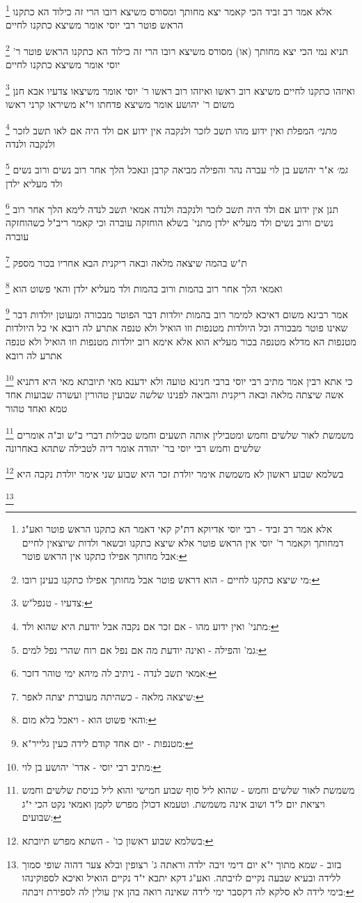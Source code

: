 \documentclass[12pt, openany]{book}
\newcommand{\footnotecomment}[1]{
	\renewcommand\thefootnote{}
	\footnote{#1}}
\newcommand{\commenta}[1]{\footnotecomment{#1}}
\begin{document}
{{\commenta{אלא אמר רב זביד - רבי יוסי אדיוקא דת"ק קאי דאמר הא כתקנו הראש פוטר ואע"ג דמחותך וקאמר ר' יוסי אין הראש פוטר אלא שיצא כתקנו וכשאר ולדות שיוצאין לחיים אבל מחותך אפילו כתקנו אין הראש פוטר:}
אלא אמר רב זביד הכי קאמר יצא מחותך ומסורס משיצא רובו הרי זה כילוד הא כתקנו הראש פוטר רבי יוסי אומר משיצא כתקנו לחיים 
\commenta{מי שיצא כתקנו לחיים - הוא דראש פוטר אבל מחותך אפילו כתקנו בעינן רובו:}
תניא נמי הכי יצא מחותך (או) מסורס משיצא רובו הרי זה כילוד הא כתקנו הראש פוטר ר' יוסי אומר משיצא כתקנו לחיים 
\commenta{צדעיו - טנפל"ש:}
ואיזהו כתקנו לחיים משיצא רוב ראשו ואיזהו רוב ראשו ר' יוסי אומר משיצאו צדעיו אבא חנן משום ר' יהושע אומר משיצא פדחתו וי"א משיראו קרני ראשו
\commenta{מתני' ואין ידוע מהו - אם זכר אם נקבה אבל יודעת היא שהוא ולד:}
{\large\emph{מתני׳}} המפלת ואין ידוע מהו תשב לזכר ולנקבה אין ידוע אם ולד היה אם לאו תשב לזכר ולנקבה ולנדה
\commenta{גמ' והפילה - ואינה יודעת מה אם נפל אם רוח שהרי נפל למים:}
{\large\emph{גמ׳}} א"ר יהושע בן לוי עברה נהר והפילה מביאה קרבן ונאכל הלך אחר רוב נשים ורוב נשים ולד מעליא ילדן 
\commenta{אמאי תשב לנדה - ניתיב לה מיהא ימי טוהר דזכר:}
תנן אין ידוע אם ולד היה תשב לזכר ולנקבה ולנדה אמאי תשב לנדה לימא הלך אחר רוב נשים ורוב נשים ולד מעליא ילדן 
מתני' בשלא הוחזקה עוברה וכי קאמר ריב"ל כשהוחזקה עוברה 
\commenta{שיצאה מלאה - כשהיתה מעוברת יצתה לאפר:}
ת"ש בהמה שיצאה מלאה ובאה ריקנית הבא אחריו בכור מספק 
\commenta{והאי פשוט הוא - ויאכל בלא מום:}
ואמאי הלך אחר רוב בהמות ורוב בהמות ולד מעליא ילדן והאי פשוט הוא 
\commenta{מטנפות - יום אחד קודם לידה כעין גלייר"א:}
אמר רבינא משום דאיכא למימר רוב בהמות יולדות דבר הפוטר מבכורה ומעוטן יולדות דבר שאינו פוטר מבכורה וכל היולדות מטנפות וזו הואיל ולא טנפה אתרע לה רובא 
אי כל היולדות מטנפות הא מדלא מטנפה בכור מעליא הוא אלא אימא רוב יולדות מטנפות וזו הואיל ולא טנפה אתרע לה רובא 
\commenta{מתיב רבי יוסי - אדר' יהושע בן לוי:}
כי אתא רבין אמר מתיב רבי יוסי ברבי חנינא טועה ולא ידענא מאי תיובתא מאי היא דתניא
אשה שיצתה מלאה ובאה ריקנית והביאה לפנינו שלשה שבועין טהורין ועשרה שבועות אחד טמא ואחד טהור
\commenta{משמשת לאור שלשים וחמש - שהוא ליל סוף שבוע חמישי והוא ליל כניסת שלשים וחמש ויציאת יום ל"ד ושוב אינה משמשת. וטעמא דכולן מפרש לקמן ואמאי נקט הכי י"ג שבועים:}
משמשת לאור שלשים וחמש ומטבילין אותה תשעים וחמש טבילות דברי ב"ש וב"ה אומרים שלשים וחמש רבי יוסי בר' יהודה אומר דיה לטבילה שתהא באחרונה 
\commenta{בשלמא שבוע ראשון כו' - השתא מפרש תיובתא:}
בשלמא שבוע ראשון לא משמשת אימר יולדת זכר היא שבוע שני אימר יולדת נקבה היא
\commenta{בזוב - שמא מתוך י"א יום דימי זיבה ילדה וראתה ג' רצופין ובלא צער דהוה שופי סמוך ללידה ובעיא שבעה נקיים לזיבתה. ואע"ג דקא יתבא י"ד נקיים הואיל ואיכא לספוקינהו בימי לידה לא סלקא לה דקסבר ימי לידה שאינה רואה בהן אין עולין לה לספירת זיבתה:}
}}
\end{document}
